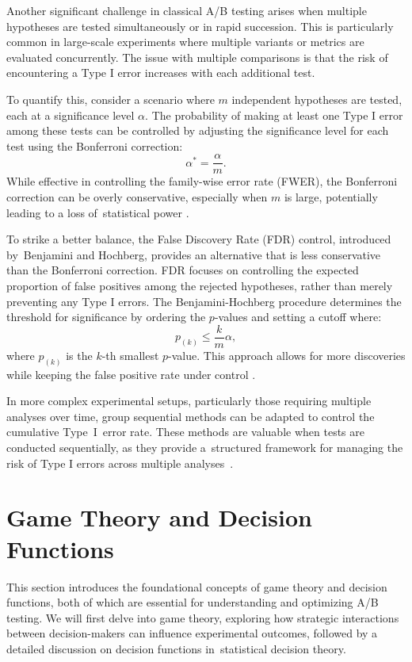\documentclass[magisterska, english]{pwr_wmat_praca_dyplomowa}
\theoremstyle{plain}
\numberwithin{theorem}{chapter}
\theoremstyle{definition}
\numberwithin{theorem}{chapter}
\begin{document}
Another significant challenge in classical A/B testing arises when multiple hypotheses are tested simultaneously or in rapid succession. This is particularly common in large-scale experiments where multiple variants or metrics are evaluated concurrently. The issue with multiple comparisons is that the risk of encountering a Type I error increases with each additional test.

To quantify this, consider a scenario where \( m \) independent hypotheses are tested, each at a significance level \( \alpha \). The probability of making at least one Type I error among these tests can be controlled by adjusting the significance level for each test using the Bonferroni correction:
\[
\alpha^* = \frac{\alpha}{m}.
\]
While effective in controlling the family-wise error rate (FWER), the Bonferroni correction can be overly conservative, especially when \( m \) is large, potentially leading to a loss of~statistical power \cite{Holm1979}.

To strike a better balance, the False Discovery Rate (FDR) control, introduced by~Benjamini and Hochberg, provides an alternative that is less conservative than the Bonferroni correction. FDR focuses on controlling the expected proportion of false positives among the rejected hypotheses, rather than merely preventing any Type I errors. The Benjamini-Hochberg procedure determines the threshold for significance by ordering the \( p \)-values and setting a cutoff where:
\[
p_{(k)} \leq \frac{k}{m} \alpha,
\]
where \( p_{(k)} \) is the \( k \)-th smallest \( p \)-value. This approach allows for more discoveries while keeping the false positive rate under control \cite{Benjamini1995}.

In more complex experimental setups, particularly those requiring multiple analyses over time, group sequential methods can be adapted to control the cumulative Type~I~error rate. These methods are valuable when tests are conducted sequentially, as they provide a~structured framework for managing the risk of Type I errors across multiple analyses~\cite{Pocock1977}.

\section{Game Theory and Decision Functions}

This section introduces the foundational concepts of game theory and decision functions, both of which are essential for understanding and optimizing A/B testing. We will first delve into game theory, exploring how strategic interactions between decision-makers can influence experimental outcomes, followed by a detailed discussion on decision functions in~statistical decision theory.
\end{document}
